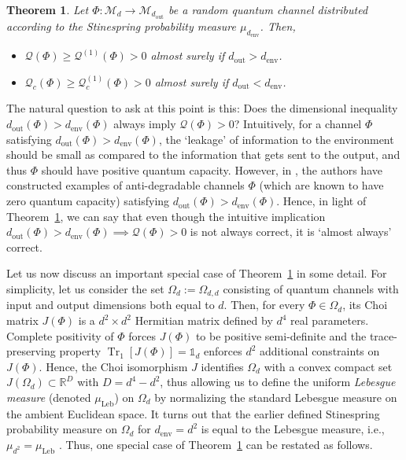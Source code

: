 \documentclass[a4paper,onecolumn,10pt,accepted=2022-07-11]{quantumarticle}
\newcommand{\M}[1]{\mathcal{M}_{#1}}
\newcommand{\env}{\operatorname{env}}
\newcommand{\out}{\operatorname{out}}
\newcommand{\leb}{\operatorname{Leb}}
\newtheorem{theorem}{Theorem}[section]
\theoremstyle{definition}
\newcommand{\iden}{\mathbb{1}}
\begin{document}
\begin{theorem}\label{theorem:main}
Let $\Phi:\M{d}\to \M{d_{\out}}$ be a random quantum channel distributed according to the Stinespring probability measure $\mu_{d_{\env}}$. Then,
\begin{itemize}
    \item $\mathcal{Q}(\Phi)\geq\mathcal{Q}^{(1)}(\Phi)>0$ almost surely if $d_{\out}>d_{\env}$.
    \item $\mathcal{Q}_c(\Phi)\geq\mathcal{Q}^{(1)}_c(\Phi)>0$ almost surely if $d_{\out}<d_{\env}$.
\end{itemize}
\end{theorem}

The natural question to ask at this point is this: Does the dimensional inequality $d_{\out}(\Phi)>d_{\env}(\Phi)$ always imply $\mathcal{Q}(\Phi)>0$? Intuitively, for a channel $\Phi$ satisfying $d_{\out}(\Phi)>d_{\env}(\Phi)$, the `leakage' of information to the environment should be small as compared to the information that gets sent to the output, and thus $\Phi$ should have positive quantum capacity. However, in \cite{Cubitt2008degradable}, the authors have constructed examples of anti-degradable channels $\Phi$ (which are known to have zero quantum capacity) satisfying $d_{\out}(\Phi)>d_{\env}(\Phi)$. Hence, in light of Theorem~\ref{theorem:main}, we can say that even though the intuitive implication $d_{\out}(\Phi)>d_{\env}(\Phi)\implies \mathcal{Q}(\Phi)>0$ is not always correct, it is `almost always' correct.

Let us now discuss an important special case of Theorem~\ref{theorem:main} in some detail. For simplicity, let us consider the set $\Omega_d:=\Omega_{d,d}$ consisting of quantum channels with input and output dimensions both equal to $d$.
Then, for every $\Phi\in\Omega_d$, its Choi matrix $J(\Phi)$ is a $d^2\times d^2$ Hermitian matrix defined by $d^4$ real parameters. Complete positivity of $\Phi$ forces $J(\Phi)$ to be positive semi-definite and the trace-preserving property $\operatorname{Tr}_1[J(\Phi)]=\iden_d$ enforces $d^2$ additional constraints on $J(\Phi)$. Hence, the Choi isomorphism $J$ identifies $\Omega_d$ with a convex compact set $J(\Omega_d)\subset \mathbb{R}^D$ with $D=d^4-d^2$, thus allowing us to define the uniform \emph{Lebesgue measure} (denoted $\mu_{\leb}$) on $\Omega_d$ by normalizing the standard Lebesgue measure on the ambient Euclidean space. It turns out that the earlier defined Stinespring probability measure on $\Omega_d$ for $d_{\env}=d^2$ is equal to the Lebesgue measure, i.e., $\mu_{d^2}=\mu_{\leb}$ \cite[Proposition 3]{kukulski2021generating}. Thus, one special case of Theorem~\ref{theorem:main} can be restated as follows.
\end{document}
